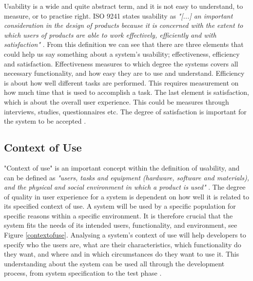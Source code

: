 Usability is a wide and quite abstract term, and it is not easy to understand, to measure, or to practise right. ISO 9241 states usability as \emph{"[...] an important consideration in the design of products because it is concerned with the extent to which users of products are able to work effectively, efficiently and with satisfaction"} \cite{usabilitydef}. From this definition we can see that there are three elements that could help us say something about a system's usability; effectiveness, efficiency and satisfaction. Effectiveness measures to which degree the systems covers all necessary functionality, and how easy they are to use and understand. Efficiency is about how well different tasks are performed. This requires measurement on how much time that is used to accomplish a task. The last element is satisfaction, which is about the overall user experience. This could be measures through interviews, studies, questionnaires etc. The degree of satisfaction is important for the system to be accepted \cite{mmi}. 

\subsection{Context of Use}
"Context of use" is an important concept within the definition of usability, and can be defined as \emph{"users, tasks and equipment (hardware, software and materials), and the physical and social environment in which a product is used"} \cite{maguire2001context}. The degree of quality in user experience for a system is dependent on how well it is related to its specified context of use. A system will be used by a specific population for specific reasons within a specific environment. It is therefore crucial that the system fits the needs of its intended users, functionality, and environment, see Figure \ref{contextofuse}. Analysing a system's context of use will help developers to specify who the users are, what are their characteristics, which functionality do they want, and where and in which circumstances do they want to use it. This understanding about the system can be used all through the development process, from system specification to the test phase \cite{maguire2001context}.

